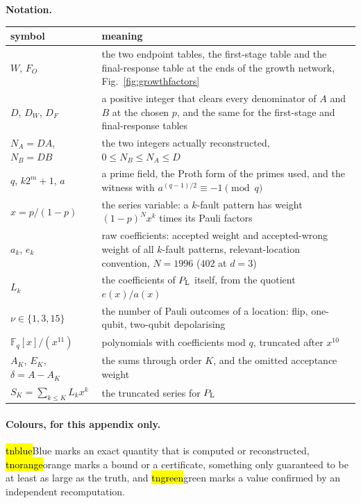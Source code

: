 \noindent\begin{minipage}{\linewidth}
\medskip\noindent\textbf{Notation.}\par\nopagebreak
{\color{black}
\begin{center}\small
\begin{tabular}{lp{11.5cm}}\toprule
symbol & meaning \\\midrule
$W$, $F_O$ & the two endpoint tables, the first-stage table and the final-response table at the ends of the growth network, Fig.~\ref{fig:growthfactors} \\
$D$, $D_W$, $D_F$ & a positive integer that clears every denominator of $A$ and $B$ at the chosen $p$, and the same for the first-stage and final-response tables \\
$N_A=DA$, $N_B=DB$ & the two integers actually reconstructed, $0\le N_B\le N_A\le D$ \\
$q$, $k2^m+1$, $a$ & a prime field, the Proth form of the primes used, and the witness with $a^{(q-1)/2}\equiv-1\pmod q$ \\
$x=p/(1-p)$ & the series variable: a $k$-fault pattern has weight $(1-p)^N x^k$ times its Pauli factors \\
$a_k$, $e_k$ & raw coefficients: accepted weight and accepted-wrong weight of all $k$-fault patterns, relevant-location convention, $N=1996$ ($402$ at $d=3$) \\
$L_k$ & the coefficients of $P_{\mathrm L}$ itself, from the quotient $e(x)/a(x)$ \\
$\nu\in\{1,3,15\}$ & the number of Pauli outcomes of a location: flip, one-qubit, two-qubit depolarising \\
$\mathbb F_q[x]/(x^{11})$ & polynomials with coefficients mod $q$, truncated after $x^{10}$ \\
$A_K$, $E_K$, $\delta=A-A_K$ & the sums through order $K$, and the omitted acceptance weight \\
$S_K=\sum_{k\le K}L_kx^k$ & the truncated series for $P_{\mathrm L}$ \\
\bottomrule
\end{tabular}
\end{center}}
\end{minipage}
\paragraph{Colours, for this appendix only.} \hl{tnblue}{Blue} marks an exact quantity that is computed or reconstructed, \hl{tnorange}{orange} marks a bound or a certificate, something only guaranteed to be at least as large as the truth, and \hl{tngreen}{green} marks a value confirmed by an independent recomputation.

